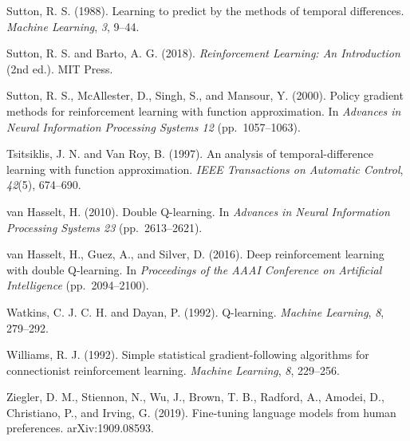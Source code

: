 \begin{list}{}{%
  \setlength{\leftmargin}{1.6em}%
  \setlength{\itemindent}{-1.6em}%
  \setlength{\itemsep}{0.55em}%
  \setlength{\parsep}{0pt}%
  \setlength{\topsep}{0.6em}%
}
\item{}\label{cite:sutton1988}%
Sutton, R. S. (1988). Learning to predict by the methods of temporal differences. \textit{Machine Learning}, \textit{3}, 9--44.

\item{}\label{cite:suttonbarto2018}%
Sutton, R. S. and Barto, A. G. (2018). \textit{Reinforcement Learning: An Introduction} (2nd ed.). MIT Press.

\item{}\label{cite:sutton2000}%
Sutton, R. S., McAllester, D., Singh, S., and Mansour, Y. (2000). Policy gradient methods for reinforcement learning with function approximation. In \textit{Advances in Neural Information Processing Systems 12} (pp.\ 1057--1063).

\item{}\label{cite:tsitsiklis1997}%
Tsitsiklis, J. N. and Van Roy, B. (1997). An analysis of temporal-difference learning with function approximation. \textit{IEEE Transactions on Automatic Control}, \textit{42}(5), 674--690.

\item{}\label{cite:vanhasselt2010}%
van Hasselt, H. (2010). Double Q-learning. In \textit{Advances in Neural Information Processing Systems 23} (pp.\ 2613--2621).

\item{}\label{cite:vanhasselt2016}%
van Hasselt, H., Guez, A., and Silver, D. (2016). Deep reinforcement learning with double Q-learning. In \textit{Proceedings of the AAAI Conference on Artificial Intelligence} (pp.\ 2094--2100).

\item{}\label{cite:watkins1992}%
Watkins, C. J. C. H. and Dayan, P. (1992). Q-learning. \textit{Machine Learning}, \textit{8}, 279--292.

\item{}\label{cite:williams1992}%
Williams, R. J. (1992). Simple statistical gradient-following algorithms for connectionist reinforcement learning. \textit{Machine Learning}, \textit{8}, 229--256.

\item{}\label{cite:ziegler2019}%
Ziegler, D. M., Stiennon, N., Wu, J., Brown, T. B., Radford, A., Amodei, D., Christiano, P., and Irving, G. (2019). Fine-tuning language models from human preferences. arXiv:1909.08593.

\end{list}
